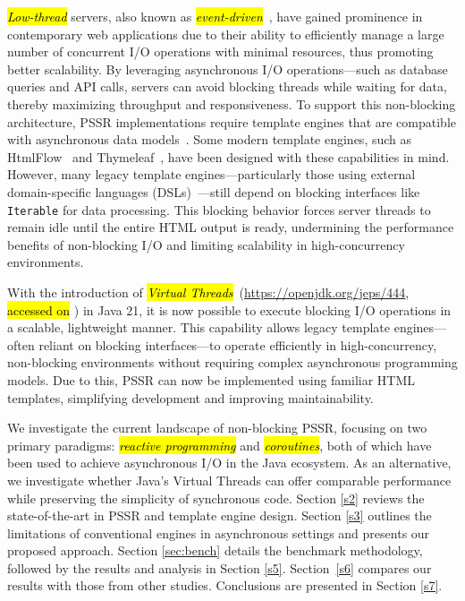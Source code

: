 \documentclass[software,article,accept,pdftex,moreauthors]{Definitions/mdpi}
\begin{document}
\textit{\hl{Low-thread}} servers, also known as
\textit{\hl{event-driven}}~\cite{event-driven-servers}, have gained prominence in
contemporary web applications due to their ability to efficiently manage a large
number of concurrent I/O operations with minimal resources, thus promoting
better scalability.
By leveraging asynchronous I/O operations---such as
database queries and API calls, servers can avoid blocking threads while
waiting for data, thereby maximizing throughput and responsiveness. To support
this non-blocking architecture, PSSR implementations require template engines
that are compatible with asynchronous data models~\cite{carvalho2023async}.
Some modern template engines, such as HtmlFlow~\cite{htmlflow} and Thymeleaf~\cite{thymeleaf}, have
been designed with these capabilities in mind. However, many legacy
template engines---particularly those using external domain-specific languages
(DSLs)~\cite{Fowler03}---still depend on blocking interfaces like
\texttt{Iterable} for data processing. This blocking behavior forces server
threads to remain idle until the entire HTML output is ready, undermining the
performance benefits of non-blocking I/O and limiting scalability in
high-concurrency environments.

With the introduction of \textit{\hl{Virtual
    Threads}}~({\url{https://openjdk.org/jeps/444}}, \hl{accessed on}%
) in Java 21, it is now
possible to execute blocking I/O operations in a scalable, lightweight manner.
This capability allows legacy template engines---often reliant on blocking
interfaces---to operate efficiently in high-concurrency, non-blocking
environments without requiring complex asynchronous programming models. Due to this, PSSR can now be implemented using familiar HTML templates, simplifying
development and improving maintainability.

We investigate the current landscape of non-blocking PSSR, focusing on two
primary paradigms: \textit{\hl{reactive programming}} and \textit{\hl{coroutines}}, both
of which have been used to achieve asynchronous I/O in the Java ecosystem. As
an alternative, we investigate whether Java’s Virtual Threads can offer
comparable performance while preserving the simplicity of synchronous code.
Section \ref{s2} reviews the state-of-the-art in PSSR and template engine design.
Section \ref{s3} outlines the limitations of conventional engines in asynchronous
settings and presents our proposed approach. Section \ref{sec:bench} details the benchmark
methodology, followed by the results and analysis in Section \ref{s5}.
Section~\ref{s6} compares our results with those from other studies.
Conclusions are presented in Section \ref{s7}.
\end{document}
